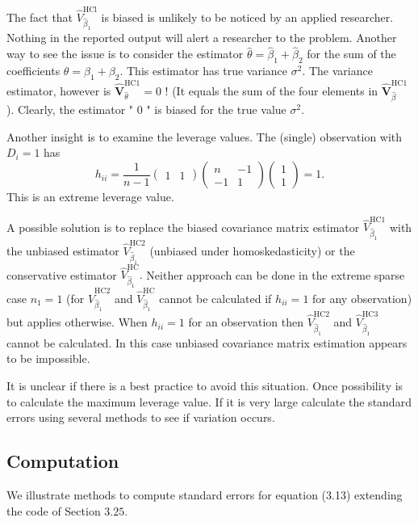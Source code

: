 \documentclass[10pt]{article}
\begin{document}
The fact that $\widehat{V}_{\widehat{\beta}_{1}}^{\mathrm{HCl}}$ is biased is unlikely to be noticed by an applied researcher. Nothing in the reported output will alert a researcher to the problem. Another way to see the issue is to consider the estimator $\widehat{\theta}=\widehat{\beta}_{1}+\widehat{\beta}_{2}$ for the sum of the coefficients $\theta=\beta_{1}+\beta_{2}$. This estimator has true variance $\sigma^{2}$. The variance estimator, however is $\widehat{\boldsymbol{V}}_{\widehat{\theta}}^{\mathrm{HC1}}=0$ ! (It equals the sum of the four elements in $\widehat{\boldsymbol{V}}_{\widehat{\beta}}^{\mathrm{HC1}}$ ). Clearly, the estimator " 0 " is biased for the true value $\sigma^{2}$.

Another insight is to examine the leverage values. The (single) observation with $D_{i}=1$ has
$$
h_{i i}=\frac{1}{n-1}\left(\begin{array}{ll}
1 & 1
\end{array}\right)\left(\begin{array}{cc}
n & -1 \\
-1 & 1
\end{array}\right)\left(\begin{array}{l}
1 \\
1
\end{array}\right)=1 .
$$
This is an extreme leverage value.

A possible solution is to replace the biased covariance matrix estimator $\widehat{V}_{\widehat{\beta}_{1}}^{\mathrm{HC1}}$ with the unbiased estimator $\widehat{V}_{\widehat{\beta}_{1}}^{\mathrm{HC} 2}$ (unbiased under homoskedasticity) or the conservative estimator $\widehat{V}_{\widehat{\beta}_{1}}^{\mathrm{HC}} .$ Neither approach can be done in the extreme sparse case $n_{1}=1$ (for $\widehat{V}_{\widehat{\beta}_{1}}^{\mathrm{HC} 2}$ and $\widehat{V}_{\widehat{\beta}_{1}}^{\mathrm{HC}}$ cannot be calculated if $h_{i i}=1$ for any observation) but applies otherwise. When $h_{i i}=1$ for an observation then $\widehat{V}_{\widehat{\beta}_{1}}^{\mathrm{HC} 2}$ and $\widehat{V}_{\widehat{\beta}_{1}}^{\mathrm{HC} 3}$ cannot be calculated. In this case unbiased covariance matrix estimation appears to be impossible.

It is unclear if there is a best practice to avoid this situation. Once possibility is to calculate the maximum leverage value. If it is very large calculate the standard errors using several methods to see if variation occurs.

\subsection{Computation}
We illustrate methods to compute standard errors for equation (3.13) extending the code of Section $3.25 .$
\end{document}
